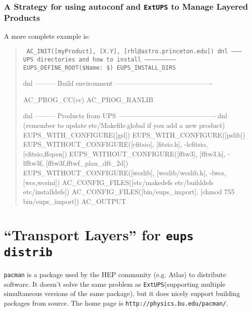 \documentclass{article}
\newcommand{\code}[1]{\texttt{#1}}
\newcommand{\eups}{\code{ExtUPS}\xspace}
\newcommand{\pacman}{\code{pacman}}
\begin{document}
\subsubsection{A Strategy for using autoconf and \eups to Manage Layered Products}


A more complete example is:

\begin{quote}
    \obeylines\tt\small\parskip=0pt
AC\_INIT([myProduct], [X.Y], [rhl@astro.princeton.edu])
\vspace{5pt}
dnl --------- UPS directories and how to install --------------------------
\vspace{5pt}
EUPS\_DEFINE\_ROOT(\${Name}:  \$)
EUPS\_INSTALL\_DIRS
\vspace{5pt}

dnl --------- Build environment -------------------------------------------

AC\_PROG\_CC(cc)
AC\_PROG\_RANLIB

dnl --------- Products from UPS -------------------------------------------
dnl (remember to update etc/Makefile.global if you add a new product)
\vspace{5pt}
EUPS\_WITH\_CONFIGURE([gsl])
EUPS\_WITH\_CONFIGURE([pslib])
\vspace{5pt}
EUPS\_WITHOUT\_CONFIGURE([cfitsio], [fitsio.h],
                        -lcfitsio, [cfitsio,ffopen])
EUPS\_WITHOUT\_CONFIGURE([fftw3],   [fftw3.h],
                        -lfftw3f,  [fftw3f,fftwf\_plan\_dft\_2d])
EUPS\_WITHOUT\_CONFIGURE([wcslib],  [wcslib/wcslib.h],
                        -lwcs,     [wcs,wcsini])
\vspace{5pt}
AC\_CONFIG\_FILES([etc/makedefs etc/builddefs etc/installdefs])
AC\_CONFIG\_FILES([bin/eups\_import], [chmod 755 bin/eups\_import])
\vspace{5pt}
AC\_OUTPUT
\end{quote}

\section{``Transport Layers'' for \code{eups distrib}}
\label{pacman}

\pacman{} is a package used by the HEP community (e.g. Atlas) to distribute
software.  It doesn't solve the same problem as \eups (supporting
multiple simultaneous versions of the same package), but it does nicely
support building packages from source.  The home page is \code{http://physics.bu.edu/pacman/}.
\end{document}

